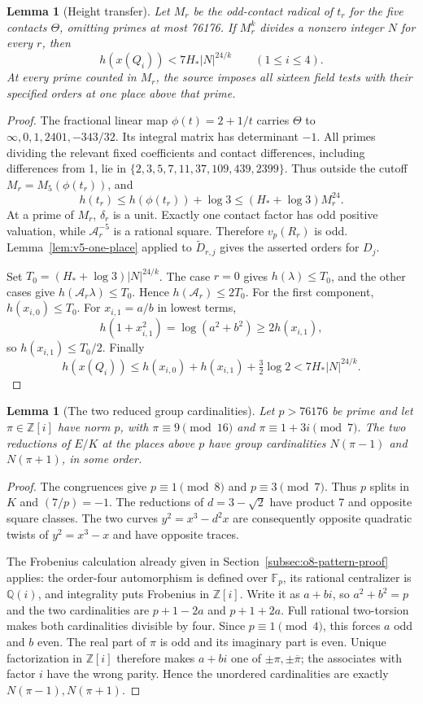 \documentclass[11pt]{article}
\newtheorem{lemma}[theorem]{Lemma}
\theoremstyle{definition}
\theoremstyle{remark}
\newcommand{\Q}{\mathbb Q}
\newcommand{\Z}{\mathbb Z}
\newcommand{\F}{\mathbb F}
\begin{document}
\begin{lemma}[Height transfer]\label{lem:v5-height-transfer}
Let $M_r$ be the odd-contact radical of $t_r$ for the five contacts
$\Theta$, omitting primes at most 76176. If $M_r^k$ divides a
nonzero integer $N$ for every $r$, then
\[
 h(x(Q_i))<7H_*|N|^{24/k}\qquad(1\le i\le4).
\]
At every prime counted in $M_r$, the source imposes all sixteen
field tests with their specified orders at one place above that prime.
\end{lemma}
\begin{proof}
The fractional linear map $\phi(t)=2+1/t$ carries $\Theta$ to
$\infty,0,1,2401,-343/32$. Its integral matrix has determinant $-1$.
All primes dividing the relevant fixed coefficients and contact
differences, including differences from 1, lie in
$\{2,3,5,7,11,37,109,439,2399\}$. Thus outside the cutoff
$M_r=M_5(\phi(t_r))$, and
\[
 h(t_r)\le h(\phi(t_r))+\log3
       \le(H_*+\log3)M_r^{24}.
\]
At a prime of $M_r$, $\delta_r$ is a unit. Exactly one contact
factor has odd positive valuation, while $\mathcal A_r^{-5}$ is
a rational square. Therefore $v_p(R_r)$ is odd.
Lemma~\ref{lem:v5-one-place} applied to $\widetilde D_{r,j}$ gives
the asserted orders for $D_j$.

Set $T_0=(H_*+\log3)|N|^{24/k}$. The case $r=0$ gives
$h(\lambda)\le T_0$, and the other cases give
$h(\mathcal A_r\lambda)\le T_0$. Hence
$h(\mathcal A_r)\le2T_0$. For the first component,
$h(x_{i,0})\le T_0$. For $x_{i,1}=a/b$ in lowest terms,
\[
 h(1+x_{i,1}^2)=\log(a^2+b^2)\ge2h(x_{i,1}),
\]
so $h(x_{i,1})\le T_0/2$. Finally
\[
 h(x(Q_i))\le h(x_{i,0})+h(x_{i,1})+\tfrac32\log2
 <7H_*|N|^{24/k}.
\]
\end{proof}

\begin{lemma}[The two reduced group cardinalities]
\label{lem:v5-two-reductions}
Let $p>76176$ be prime and let $\pi\in\Z[i]$ have norm $p$, with
$\pi\equiv9\pmod{16}$ and $\pi\equiv1+3i\pmod7$.
The two reductions of $E/K$ at the places above $p$ have group
cardinalities $N(\pi-1)$ and $N(\pi+1)$, in some order.
\end{lemma}
\begin{proof}
The congruences give $p\equiv1\pmod8$ and $p\equiv3\pmod7$.
Thus $p$ splits in $K$ and $(7/p)=-1$. The reductions of
$d=3-\sqrt2$ have product 7 and opposite square classes. The two
curves $y^2=x^3-d^2x$ are consequently opposite quadratic twists
of $y^2=x^3-x$ and have opposite traces.

The Frobenius calculation already given in
Section~\ref{subsec:o8-pattern-proof} applies: the order-four
automorphism is defined over $\F_p$, its rational centralizer is
$\Q(i)$, and integrality puts Frobenius in $\Z[i]$.
Write it as $a+bi$, so $a^2+b^2=p$ and the two cardinalities are
$p+1-2a$ and $p+1+2a$. Full rational two-torsion makes both
cardinalities divisible by four. Since $p\equiv1\pmod4$, this
forces $a$ odd and $b$ even. The real part of $\pi$ is odd and its
imaginary part is even. Unique factorization in $\Z[i]$ therefore
makes $a+bi$ one of $\pm\pi,\pm\overline\pi$; the associates
with factor $i$ have the wrong parity. Hence the unordered
cardinalities are exactly $N(\pi-1),N(\pi+1)$.
\end{proof}
\end{document}
